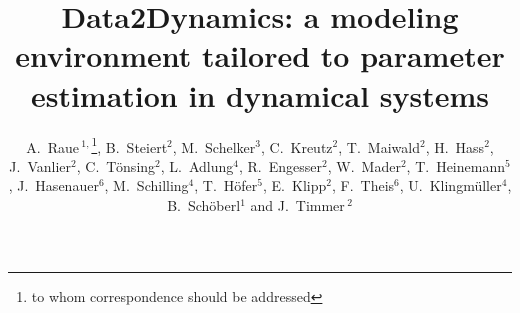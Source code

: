 \documentclass{bioinfo}
\begin{document}

\title[Data2Dynamics]{Data2Dynamics: a modeling environment tailored to parameter 
estimation in dynamical systems}
\author[A.~Raue \textit{et~al.}]{
A.~Raue\,$^{1,}$\footnote{to whom correspondence 
should be addressed}, 
B.~Steiert$^{2}$, 
M.~Schelker$^{3}$, 
C.~Kreutz$^{2}$, 
T.~Maiwald$^{2}$, 
H.~Hass$^{2}$, 
J.~Vanlier$^{2}$, 
C.~T\"onsing$^{2}$, 
L.~Adlung$^{4}$, 
R.~Engesser$^{2}$, 
W.~Mader$^{2}$, 
T.~Heinemann$^{5}$, 
J.~Hasenauer$^{6}$, 
M.~Schilling$^{4}$, 
T.~H\"ofer$^{5}$, 
E.~Klipp$^{2}$, 
F.~Theis$^{6}$, 
U.~Klingm\"uller$^{4}$,
B.~Sch\"oberl$^{1}$ 
and J.~Timmer\,$^{2}$}
\address{$^{1}$Merrimack Pharmaceuticals Inc., 02139 Cambridge, MA, USA\\
$^{2}$University of Freiburg, Institute for Physics, 79104 Freiburg, Germany\\
$^{3}$Humboldt-Universit\"at zu Berlin, Theoretical Biophysics, 10115 Berlin, Germany\\
$^{4}$German Cancer Research Center, 69120 Heidelberg, Germany.\\
$^{5}$BioQuant, University of Heidelberg, 69120 Freiburg, Germany\\
$^{6}$Helmholtz Center Munich, 85764 Neuherberg, Germany.}



\maketitle
\end{document}
